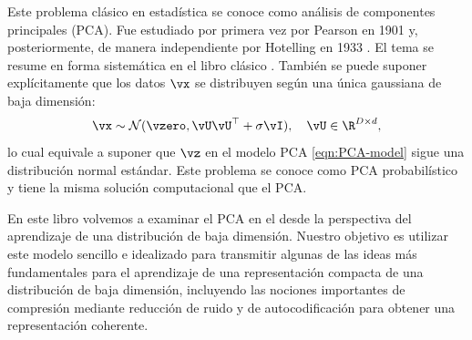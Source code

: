 \documentclass[../../book-main_es.tex]{subfiles}
\begin{document}
Este problema clásico en estadística se conoce como análisis de componentes principales
(PCA). Fue estudiado por primera vez por Pearson en 1901
\cite{Pearson1901} y, posteriormente, de manera independiente por Hotelling en 1933
\cite{Hotelling1933}. El tema se resume en forma sistemática en el
libro clásico \cite{Jolliffe1986,JolliffeI2002}. También se puede suponer 
explícitamente que los datos \(\vx\) se distribuyen
según una única gaussiana de baja dimensión:
\begin{equation}
    \vx \sim \mathcal{N}(\vzero, \vU\vU^{\top} + \sigma \vI), \quad
    \vU \in \R^{D\times d},
\end{equation}
lo cual equivale a suponer que \(\vz\) en el modelo PCA
\eqref{eqn:PCA-model} sigue una distribución normal estándar. Este problema
se conoce como PCA probabilístico \cite{TippingM1999} y tiene la misma
solución computacional que el PCA.

En este libro volvemos a examinar el PCA en el  desde la
perspectiva del aprendizaje de una distribución de baja dimensión. Nuestro objetivo es
utilizar este modelo sencillo e idealizado para transmitir algunas de las ideas más
fundamentales para el aprendizaje de una representación compacta de una distribución de baja 
dimensión, incluyendo las nociones importantes de compresión mediante reducción de ruido 
y de autocodificación para obtener una representación coherente.
\end{document}
